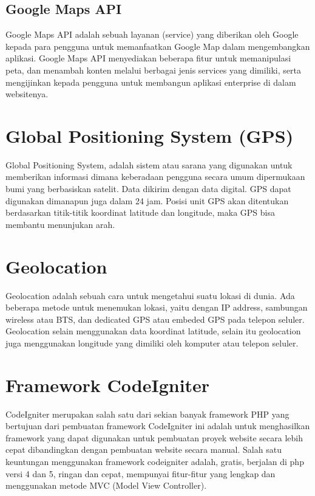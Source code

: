 \subsection {Google Maps API }
Google Maps API adalah sebuah layanan (service) yang diberikan oleh Google
kepada para pengguna untuk memanfaatkan Google Map dalam mengembangkan
aplikasi. Google Maps API menyediakan beberapa fitur untuk memanipulasi peta, dan
menambah konten melalui berbagai jenis services yang dimiliki, serta mengijinkan
kepada pengguna untuk membangun aplikasi enterprise di dalam websitenya.


\section{Global Positioning System (GPS)}
Global Positioning System, adalah sistem atau sarana yang digunakan untuk memberikan informasi dimana keberadaan pengguna secara umum dipermukaan bumi yang berbasiskan satelit. Data dikirim dengan data digital. GPS dapat digunakan dimanapun juga dalam 24 jam. Posisi unit GPS akan ditentukan berdasarkan titik-titik koordinat latitude dan longitude, maka GPS bisa membantu menunjukan arah. 


\section{Geolocation}
Geolocation adalah sebuah cara untuk mengetahui suatu lokasi di dunia. Ada beberapa metode untuk menemukan lokasi, yaitu dengan IP address, sambungan wireless atau BTS, dan dedicated GPS atau embeded GPS pada telepon seluler. Geolocation selain menggunakan data koordinat latitude, selain itu geolocation juga menggunakan longitude yang dimiliki oleh komputer atau telepon seluler.


\section{Framework CodeIgniter}
CodeIgniter merupakan salah satu dari sekian banyak framework PHP yang  bertujuan dari pembuatan framework CodeIgniter ini adalah untuk menghasilkan framework  yang dapat digunakan untuk pembuatan proyek website secara lebih cepat dibandingkan dengan pembuatan website secara manual.
Salah satu keuntungan menggunakan framework codeigniter adalah, gratis, berjalan di php versi 4 dan 5, ringan dan cepat, mempunyai fitur-fitur yang lengkap dan menggunakan metode MVC (Model View Controller).
